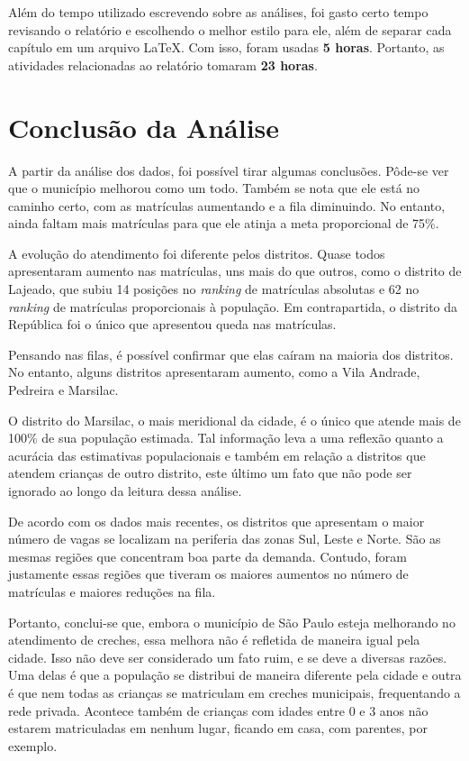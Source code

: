 \documentclass[12pt, a4paper]{article}
\begin{document}
Além do tempo utilizado escrevendo sobre as análises, foi gasto certo tempo revisando o relatório e escolhendo o melhor estilo para ele, além de separar cada capítulo em um arquivo \LaTeX. Com isso, foram usadas \textbf{5 horas}. Portanto, as atividades relacionadas ao relatório tomaram \textbf{23 horas}.

\section{Conclusão da Análise}

A partir da análise dos dados, foi possível tirar algumas conclusões. Pôde-se ver que o município melhorou como um todo. Também se nota que ele está no caminho certo, com as matrículas aumentando e a fila diminuindo. No entanto, ainda faltam mais matrículas para que ele atinja a meta proporcional de 75\%.

A evolução do atendimento foi diferente pelos distritos. Quase todos apresentaram aumento nas matrículas, uns mais do que outros, como o distrito de Lajeado, que subiu 14 posições no \textit{ranking} de matrículas absolutas e 62 no \textit{ranking} de matrículas proporcionais à população. Em contrapartida, o distrito da República foi o único que apresentou queda nas matrículas.

Pensando nas filas, é possível confirmar que elas caíram na maioria dos distritos. No entanto, alguns distritos apresentaram aumento, como a Vila Andrade, Pedreira e Marsilac.

O distrito do Marsilac, o mais meridional da cidade, é o único que atende mais de 100\% de sua população estimada. Tal informação leva a uma reflexão quanto a acurácia das estimativas populacionais e também em relação a distritos que atendem crianças de outro distrito, este último um fato que não pode ser ignorado ao longo da leitura dessa análise.

De acordo com os dados mais recentes, os distritos que apresentam o maior número de vagas se localizam na periferia das zonas Sul, Leste e Norte. São as mesmas regiões que concentram boa parte da demanda. Contudo, foram justamente essas regiões que tiveram os maiores aumentos no número de matrículas e maiores reduções na fila.

Portanto, conclui-se que, embora o município de São Paulo esteja melhorando no atendimento de creches, essa melhora não é refletida de maneira igual pela cidade. Isso não deve ser considerado um fato ruim, e se deve a diversas razões. Uma delas é que a população se distribui de maneira diferente pela cidade e outra é que nem todas as crianças se matriculam em creches municipais, frequentando a rede privada. Acontece também de crianças com idades entre 0 e 3 anos não estarem matriculadas em nenhum lugar, ficando em casa, com parentes, por exemplo.
\end{document}
